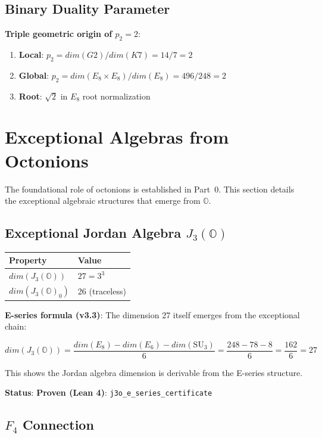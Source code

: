 \documentclass[11pt,a4paper]{article}
\newcommand{\E}{\mathrm{E}}
\newcommand{\Gtwo}{\mathrm{G}_2}
\newcommand{\Kseven}{K_7}
\newcommand{\dimE}{\mathrm{dim}}
\newcommand{\proven}{\textsc{Proven}}
\newcommand{\SU}{\mathrm{SU}}
\def\Gtwo{G2}%
\def\Kseven{K7}%
\def\E{E}%
\def\dimE{dim}%
\def\proven{Proven}%
\begin{document}
\subsection{Binary Duality Parameter}

\textbf{Triple geometric origin of $p_2 = 2$}:

\begin{enumerate}
\item \textbf{Local}: $p_2 = \dimE(\Gtwo)/\dimE(\Kseven) = 14/7 = 2$
\item \textbf{Global}: $p_2 = \dimE(\E_8\times\E_8)/\dimE(\E_8) = 496/248 = 2$
\item \textbf{Root}: $\sqrt{2}$ in $\E_8$ root normalization
\end{enumerate}

\section{Exceptional Algebras from Octonions}

The foundational role of octonions is established in Part~0. This section details the exceptional algebraic structures that emerge from $\mathbb{O}$.

\subsection{Exceptional Jordan Algebra $J_3(\mathbb{O})$}

\begin{table}[H]
\centering
\begin{tabular}{ll}
\toprule
Property & Value \\
\midrule
$\dimE(J_3(\mathbb{O}))$ & $27 = 3^3$ \\
$\dimE(J_3(\mathbb{O})_0)$ & 26 (traceless) \\
\bottomrule
\end{tabular}
\end{table}

\textbf{E-series formula (v3.3)}: The dimension 27 itself emerges from the exceptional chain:

$$\dimE(J_3(\mathbb{O})) = \frac{\dimE(\E_8) - \dimE(\E_6) - \dimE(\SU_3)}{6} = \frac{248 - 78 - 8}{6} = \frac{162}{6} = 27$$

This shows the Jordan algebra dimension is derivable from the E-series structure.

\textbf{Status}: \textbf{\proven{} (Lean 4)}: \texttt{j3o\_e\_series\_certificate}

\subsection{$F_4$ Connection}
\end{document}
